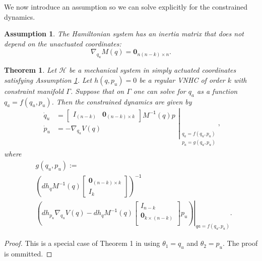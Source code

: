 \documentclass[journal,twoside,web]{ieeecolor}
\newtheorem{thm}{Theorem}%
\newtheorem{assm}{Assumption} %
\newcommand*{\inv}{^\mathsf{-1}}
\newcommand*{\Minv}{M^\mathsf{-1}}
\newcommand*{\Id}[1]{I_{#1}}
\newcommand*{\Zmat}[1]{\bm{0}_{#1}}
\newcommand*{\simpleB}{\begin{bmatrix}\Zmat{(n-k)\times k}\\ \Id{k}\end{bmatrix}}
\begin{document}
We now introduce an assumption so we can solve explicitly for the constrained
dynamics.

\begin{assm}\label{assm:inertially-actuated}
    The Hamiltonian system has an inertia matrix that does not depend on the
    unactuated coordinates:
    \[
        \nabla_{q_u}M(q) = \Zmat{n(n-k) \times n}
        .
    \]
\end{assm}

\begin{thm}\label{thm:zero-dynamics}
    Let \(\mathcal{H}\) be a mechanical system in simply actuated
    coordinates satisfying Assumption \ref{assm:inertially-actuated}. 
    Let \(h(q,p_u) = 0\) be a regular VNHC of order \(k\) with constraint
    manifold \(\Gamma\). Suppose that on \(\Gamma\) one can solve for
    \(q_a\) as a function \(q_a = f(q_u,p_u)\).
    Then the constrained dynamics are given by
    \begin{equation}\label{eqn:qpu-dynamics}
        \left.\begin{aligned}
                \dot{q}_u &= \begin{bmatrix}
                    \Id{(n-k)} & \Zmat{(n-k) \times k}
                \end{bmatrix}\Minv(q)p \\
            \dot{p}_u &= -\nabla_{q_u}V(q) \\
            \end{aligned}{}\right|_{\begin{array}{c}
                q_a = f(q_u,p_u) \\ 
                p_a = g(q_u,p_u) \\
            \end{array}}
            ,
    \end{equation}
    where
    \begin{equation}\label{eqn:g-qpu}
    \begin{aligned}
        &g(q_u,p_u) := \\
           &\left(dh_q \Minv(q) \simpleB \right)\inv 
               \\
           &\left.\left(dh_{p_u} \nabla_{q_u}V(q) - dh_q \Minv(q)
        \begin{bmatrix}
            I_{n-k} \\
            \Zmat{k \times (n-k)} \\
    \end{bmatrix} p_u\right)\right|_{qa = f(q_u,p_u)}
        .
    \end{aligned}
    \end{equation}
\end{thm}
\begin{proof}
    This is a special case of Theorem 1 in \cite{nhvc_dynamic_walking} using
    \(\theta_1 = q_u\) and \(\theta_2 = p_u\).
    The proof is ommitted.
\end{proof}
\end{document}
